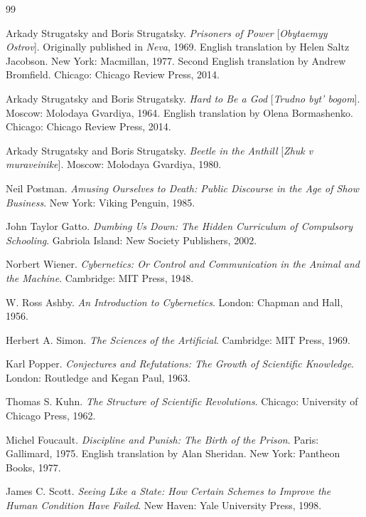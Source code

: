 \documentclass[12pt, a4paper]{article}
\theoremstyle{plain}
\theoremstyle{definition}
\theoremstyle{remark}
\begin{document}
\newpage
\begin{thebibliography}{99}

Arkady Strugatsky and Boris Strugatsky.
\textit{Prisoners of Power} [\textit{Obytaemyy
Ostrov}]. Originally published in \textit{Neva},
1969. English translation by Helen Saltz Jacobson.
New York: Macmillan, 1977. Second English
translation by Andrew Bromfield. Chicago: Chicago
Review Press, 2014.

Arkady Strugatsky and Boris Strugatsky.
\textit{Hard to Be a God} [\textit{Trudno byt'
bogom}]. Moscow: Molodaya Gvardiya, 1964.
English translation by Olena Bormashenko.
Chicago: Chicago Review Press, 2014.

Arkady Strugatsky and Boris Strugatsky.
\textit{Beetle in the Anthill} [\textit{Zhuk
v muraveinike}]. Moscow: Molodaya Gvardiya, 1980.

Neil Postman. \textit{Amusing Ourselves to Death:
Public Discourse in the Age of Show Business}.
New York: Viking Penguin, 1985.

John Taylor Gatto. \textit{Dumbing Us Down:
The Hidden Curriculum of Compulsory Schooling}.
Gabriola Island: New Society Publishers, 2002.

Norbert Wiener. \textit{Cybernetics: Or Control
and Communication in the Animal and the Machine}.
Cambridge: MIT Press, 1948.

W. Ross Ashby. \textit{An Introduction to
Cybernetics}. London: Chapman and Hall, 1956.

Herbert A. Simon. \textit{The Sciences of the
Artificial}. Cambridge: MIT Press, 1969.

Karl Popper. \textit{Conjectures and Refutations:
The Growth of Scientific Knowledge}. London:
Routledge and Kegan Paul, 1963.

Thomas S. Kuhn. \textit{The Structure of
Scientific Revolutions}. Chicago: University of
Chicago Press, 1962.

Michel Foucault. \textit{Discipline and Punish:
The Birth of the Prison}. Paris: Gallimard, 1975.
English translation by Alan Sheridan. New York:
Pantheon Books, 1977.

James C. Scott. \textit{Seeing Like a State:
How Certain Schemes to Improve the Human
Condition Have Failed}. New Haven: Yale
University Press, 1998.


\end{thebibliography}
\end{document}
